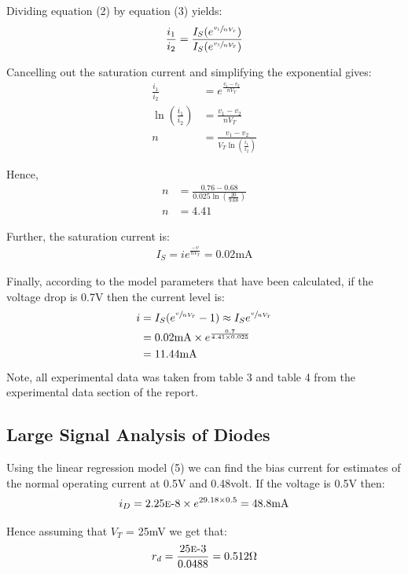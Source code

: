 \documentclass{article}
\begin{document}
Dividing equation (2) by equation (3) yields:
\begin{align}
\frac{i_1}{i_2} = \frac{I_{S}(e^{\sfrac{v_1}{nV_T}})}{I_{S}(e^{\sfrac{v_2}{nV_T}})} \nonumber
\end{align}

Cancelling out the saturation current and simplifying the exponential gives:
\begin{align*}
\frac{i_1}{i_2} &= e^{\frac{v_1-v_2}{nV_T}} \\
\ln(\frac{i_1}{i_2}) &= \frac{v_1-v_2}{nV_T} \\
n &= \frac{v_1 - v_2}{V_T\ln(\frac{i_1}{i_2})} 
\end{align*}

Hence,
\begin{align*}
n &= \frac{0.76 - 0.68}{0.025\ln(\frac{20}{9.68})}\\
n &= 4.41
\end{align*}

Further, the saturation current is:
\begin{align*}
I_S = ie^{\frac{-v}{nV_T}} = 0.02\text{mA}
\end{align*}

Finally, according to the model parameters that have been calculated, if the voltage drop is 0.7V then the current level is:
\begin{align*}
i &= I_S(e^{\sfrac{v}{nV_T}}-1) \approx I_Se^{\sfrac{v}{nV_T}}\\
&= 0.02\text{mA} \times e^{\frac{0.7}{4.41 \times 0.025}}\\
&= 11.44\text{mA}
\end{align*}

Note, all experimental data was taken from table 3 and table 4 from the experimental data section of the report.

\subsection{Large Signal Analysis of Diodes}
Using the linear regression model (5) we can find the bias current for estimates of the normal operating current at 0.5\si{\volt} and 0.48\si{volt}. If the voltage is 0.5V then:
\begin{align*}
i_D = 2.25\mbox{\sc{e}-}8 \times e^{29.18 \times 0.5} = 48.8\si{\milli\ampere}
\end{align*}

Hence assuming that $V_T$ = 25\si{\milli \volt} we get that:
\begin{align*}
r_d = \frac{25\mbox{\sc{e}-}3}{0.0488} = 0.512\si{\ohm}
\end{align*}
\end{document}
